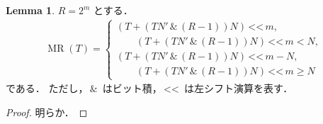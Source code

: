 \documentclass[twocolumn, uplatex, dvipdfmx]{jsarticle}
\renewcommand{\ge}{\geqslant}
\numberwithin{equation}{section}
\theoremstyle{definition}
\newtheorem{lem}{Lemma}[section]
\newcommand{\BitAnd}{\,\texttt{\&}\,}
\newcommand{\LeftShift}{\,\texttt{<<}\,}
\DeclareMathOperator{\MR}{\mathrm{MR}}
\begin{document}
\begin{lem}
	$R=2^m$ とする．
	\begin{align*}
		\MR(T)=\begin{cases}
			(T+(TN'\BitAnd (R-1))N)\LeftShift m,\\
			\qquad (T+(TN'\BitAnd (R-1))N)\LeftShift m<N,\\
			(T+(TN'\BitAnd (R-1))N)\LeftShift m-N,\\
			\qquad (T+(TN'\BitAnd (R-1))N)\LeftShift m\ge N
		\end{cases}
	\end{align*}
	である．
	ただし，$\BitAnd$ はビット積，$\LeftShift$ は左シフト演算を表す．
\end{lem}
\begin{proof}
	明らか．
\end{proof}
\end{document}
